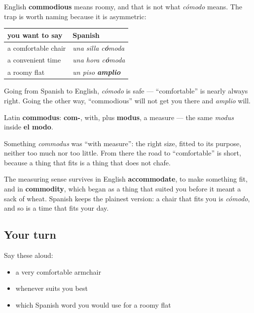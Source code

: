 \begin{grammarlens}[title={Grammar Lens: the false friend runs one way only}]
English \textbf{commodious} means roomy, and that is not what \emph{cómodo} means. The trap is worth naming because it is asymmetric:

\noindent
\begin{tabularx}{\linewidth}{@{}>{\raggedright\arraybackslash}X>{\raggedright\arraybackslash}X@{}}
\toprule
\textbf{you want to say} & \textbf{Spanish} \\
\midrule
a comfortable chair & \emph{una silla c\textbf{ó}moda} \\
a convenient time & \emph{una hora c\textbf{ó}moda} \\
a roomy flat & \emph{un piso \textbf{amplio}} \\
\bottomrule
\end{tabularx}

Going from Spanish to English, \emph{cómodo} is safe — \textquotedblleft{}comfortable\textquotedblright{} is nearly always right. Going the other way, \textquotedblleft{}commodious\textquotedblright{} will not get you there and \emph{amplio} will.
\end{grammarlens}

\begin{cousinweb}
Latin \textbf{commodus}: \textbf{com-}, with, plus \textbf{modus}, a measure — the same \emph{modus} inside \textbf{el modo}.

Something \emph{commodus} was \textquotedblleft{}with measure\textquotedblright{}: the right size, fitted to its purpose, neither too much nor too little. From there the road to \textquotedblleft{}comfortable\textquotedblright{} is short, because a thing that fits is a thing that does not chafe.

The measuring sense survives in English \textbf{accommodate}, to make something fit, and in \textbf{commodity}, which began as a thing that suited you before it meant a sack of wheat. Spanish keeps the plainest version: a chair that fits you is \emph{cómodo}, and so is a time that fits your day.
\end{cousinweb}

\subsection*{Your turn}
Say these aloud:

\begin{itemize}
\raggedright
  \item a very comfortable armchair
  \item whenever suits you best
  \item which Spanish word you would use for a roomy flat
\end{itemize}

